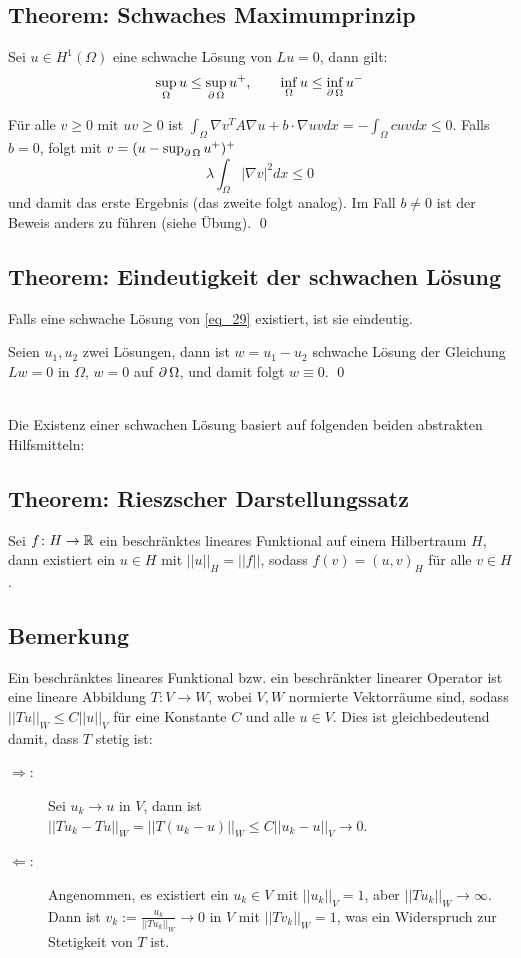 \subsection{Theorem: Schwaches Maximumprinzip}
\label{thm_66}
	Sei $u \in H^1(\Omega)$ eine schwache Lösung von $Lu = 0$, dann gilt: \marginnote{[66]}
	\[ \sup_\Omega u \leq \sup_{\operatorname{\partial} \Omega} u^+, \qquad \inf_{\Omega} u \leq \inf_{\operatorname{\partial} \Omega} u^- \]
	
	Für alle $v \geq 0$ mit $uv \geq 0$ ist $\int_{\Omega} \nabla v^T A \nabla u + b \cdot \nabla uv dx = -\int_{\Omega} cuvdx \leq 0$. Falls $b = 0$, folgt mit $v = (u - \sup_{\operatorname{\partial} \Omega} u^+)^+$
	\[ \lambda \int_{\Omega} |\nabla v|^2 dx \leq 0 \]
	und damit das erste Ergebnis (das zweite folgt analog). Im Fall $b \neq 0$ ist der Beweis anders zu führen (siehe Übung). \qed
	
\subsection{Theorem: Eindeutigkeit der schwachen Lösung}
\label{thm_67}
	Falls eine schwache Lösung von \eqref{eq_29} existiert, ist sie eindeutig. \marginnote{[67]}
	
	Seien $u_1,u_2$ zwei Lösungen, dann ist $w = u_1 -u_2$ schwache Lösung der Gleichung $Lw = 0$ in $\Omega$, $w= 0$ auf $\operatorname{\partial} \Omega$, und damit folgt $w \equiv 0$. \qed
	
\mbox{} \\
Die Existenz einer schwachen Lösung basiert auf folgenden beiden abstrakten Hilfsmitteln:

\subsection{Theorem: Rieszscher Darstellungssatz}
\label{thm_68} \label{riesz}
	Sei $f\colon H \rightarrow \mathbb{R}$ \marginnote{[68]} ein beschränktes lineares Funktional auf einem Hilbertraum $H$, dann existiert ein $u \in H$ mit $||u||_H = ||f||$, sodass $f(v) = (u,v)_H$ für alle $v \in H$.
	
\subsection{Bemerkung}
\label{bem_69}
	Ein beschränktes lineares Funktional bzw. ein beschränkter linearer Operator ist eine lineare Abbildung \marginnote{[69]} $T\colon V \rightarrow W$, wobei $V,W$ normierte Vektorräume sind, sodass $||Tu||_W \leq C ||u||_V$ für eine Konstante $C$ und alle $u \in V$. Dies ist gleichbedeutend damit, dass $T$ stetig ist:
	\begin{description}
		\item[\glqq$\Rightarrow$\grqq:] Sei $u_k \rightarrow u$ in $V$, dann ist $||Tu_k - Tu||_W = ||T(u_k - u)||_W \leq C ||u_k - u||_V \rightarrow 0$.
		\item[\glqq$\Leftarrow$\grqq:] Angenommen, es existiert ein $u_k \in V$ mit $||u_k||_V = 1$, aber $||Tu_k||_W \rightarrow \infty$. Dann ist $v_k := \frac{u_k}{||Tu_k||_W} \rightarrow 0$ in $V$ mit $||Tv_k||_W = 1$, was ein Widerspruch zur Stetigkeit von $T$ ist.
	\end{description}
	
